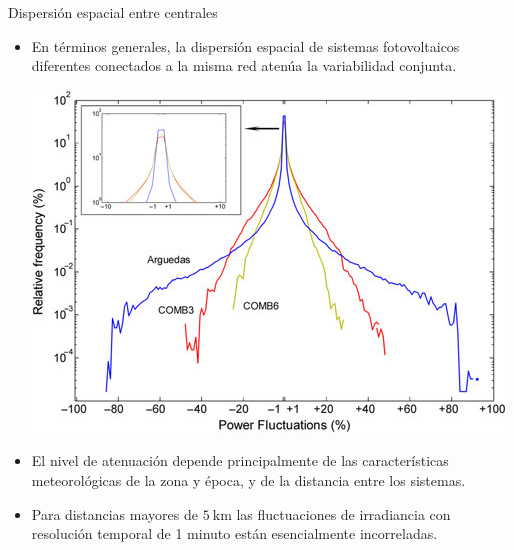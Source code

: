 \documentclass[aspectratio=169, usenames,svgnames,dvipsnames]{beamer}
\begin{document}
\begin{frame}[label={sec:orgbf3b009}]{Dispersión espacial entre centrales}
\begin{itemize}
\item En términos generales, la dispersión espacial de sistemas
fotovoltaicos diferentes conectados a la misma red atenúa la
variabilidad conjunta.

\begin{center}
\includegraphics[height=0.5\textheight]{../figs/Variabilidad_DispersionGeografica_Plantas.png}
\end{center}

\item El nivel de atenuación depende principalmente de las
características meteorológicas de la zona y época, y de la
distancia entre los sistemas.

\item Para distancias mayores de \(\SI{5}{\kilo\meter}\) las fluctuaciones
de irradiancia con resolución temporal de 1 minuto están
esencialmente incorreladas.
\end{itemize}
\end{frame}
\end{document}
